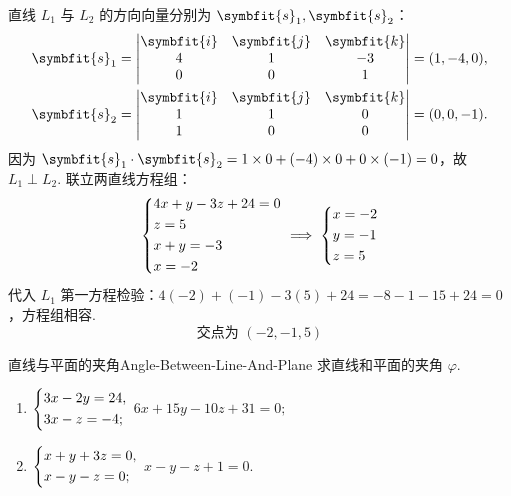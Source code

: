 \begin{solution}
    直线 $L_1$ 与 $L_2$ 的方向向量分别为 $\symbfit{s}_1, \symbfit{s}_2$：
    \begin{equation}
        \begin{aligned}
            \symbfit{s}_1 & = \begin{vmatrix} \symbfit{i} & \symbfit{j} & \symbfit{k} \\ 4 & 1 & -3 \\ 0 & 0 & 1 \end{vmatrix} = (1, -4, 0), \\
            \symbfit{s}_2 & = \begin{vmatrix} \symbfit{i} & \symbfit{j} & \symbfit{k} \\ 1 & 1 & 0 \\ 1 & 0 & 0 \end{vmatrix} = (0, 0, -1).
        \end{aligned}
    \end{equation}
    因为 $\symbfit{s}_1 \cdot \symbfit{s}_2 = 1 \times 0 + (-4) \times 0 + 0 \times (-1) = 0$，故 $L_1 \perp L_2$.
    联立两直线方程组：
    \begin{equation}
        \begin{dcases} 4x + y - 3z + 24 = 0 \\ z = 5 \\ x + y = -3 \\ x = -2 \end{dcases} \implies \begin{dcases} x = -2 \\ y = -1 \\ z = 5 \end{dcases}
    \end{equation}
    代入 $L_1$ 第一方程检验：$4(-2) + (-1) - 3(5) + 24 = -8 - 1 - 15 + 24 = 0$，方程组相容.
    \begin{equation}
        \boxed{ \text{交点为 } (-2, -1, 5) }
    \end{equation}
\end{solution}


\begin{problem}{直线与平面的夹角}{Angle-Between-Line-And-Plane}
    求直线和平面的夹角 $\varphi$.
    \begin{enumerate}
        \item \(\begin{dcases} 3x - 2y = 24, \\ 3x - z = -4; \end{dcases}\) \quad \(6x + 15y - 10z + 31 = 0;\)
        \item \(\begin{dcases} x + y + 3z = 0, \\ x - y - z = 0; \end{dcases}\) \quad \(x - y - z + 1 = 0.\)
    \end{enumerate}
\end{problem}

